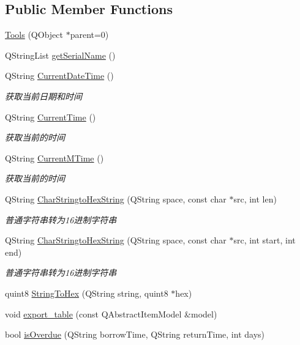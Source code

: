 \subsection*{Public Member Functions}
\begin{DoxyCompactItemize}
\item 
\mbox{\hyperlink{class_tools_a812eaff6fdce0fe489279f72c06e83e3}{Tools}} (Q\+Object $\ast$parent=0)
\item 
Q\+String\+List \mbox{\hyperlink{class_tools_ac18eb440bd7a33e8e242df2cc4d4d4bc}{get\+Serial\+Name}} ()
\item 
Q\+String \mbox{\hyperlink{class_tools_a438ea9326a6ae735d51bc3508c430a3b}{Current\+Date\+Time}} ()
\begin{DoxyCompactList}\small\item\em 获取当前日期和时间 \end{DoxyCompactList}\item 
Q\+String \mbox{\hyperlink{class_tools_af10c90501143838d9af896a60026668d}{Current\+Time}} ()
\begin{DoxyCompactList}\small\item\em 获取当前的时间 \end{DoxyCompactList}\item 
Q\+String \mbox{\hyperlink{class_tools_a70173de28152ff05b140b9895de99e20}{Current\+M\+Time}} ()
\begin{DoxyCompactList}\small\item\em 获取当前的时间 \end{DoxyCompactList}\item 
Q\+String \mbox{\hyperlink{class_tools_a89da3511a27330d893d495ddc6160a91}{Char\+Stringto\+Hex\+String}} (Q\+String space, const char $\ast$src, int len)
\begin{DoxyCompactList}\small\item\em 普通字符串转为16进制字符串 \end{DoxyCompactList}\item 
Q\+String \mbox{\hyperlink{class_tools_ae4c5caed900acc0c2ca436929a753dff}{Char\+Stringto\+Hex\+String}} (Q\+String space, const char $\ast$src, int start, int end)
\begin{DoxyCompactList}\small\item\em 普通字符串转为16进制字符串 \end{DoxyCompactList}\item 
quint8 \mbox{\hyperlink{class_tools_a724c823ede8cd11880888f64b1a3c4df}{String\+To\+Hex}} (Q\+String string, quint8 $\ast$hex)
\item 
void \mbox{\hyperlink{class_tools_af6c4eaadfb21ee231cbc4d6384250629}{export\+\_\+table}} (const Q\+Abstract\+Item\+Model \&model)
\item 
bool \mbox{\hyperlink{class_tools_a178182aebac5d407b60720335c04822a}{is\+Overdue}} (Q\+String borrow\+Time, Q\+String return\+Time, int days)
\end{DoxyCompactItemize}


